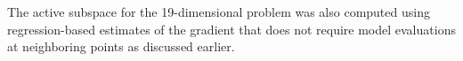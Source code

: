 
The active subspace for the 19-dimensional problem was also computed using regression-based
estimates of the gradient that does not require model evaluations at neighboring points as
discussed earlier.
%
%
%
